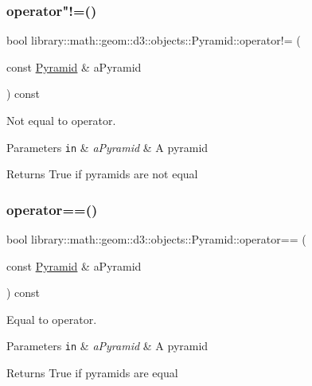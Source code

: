 \subsubsection{\texorpdfstring{operator"!=()}{operator!=()}}
{\footnotesize\ttfamily bool library\+::math\+::geom\+::d3\+::objects\+::\+Pyramid\+::operator!= (\begin{DoxyParamCaption}\item[{const \hyperlink{classlibrary_1_1math_1_1geom_1_1d3_1_1objects_1_1_pyramid}{Pyramid} \&}]{a\+Pyramid }\end{DoxyParamCaption}) const}



Not equal to operator. 


\begin{DoxyParams}[1]{Parameters}
\mbox{\tt in}  & {\em a\+Pyramid} & A pyramid \\
\hline
\end{DoxyParams}
\begin{DoxyReturn}{Returns}
True if pyramids are not equal 
\end{DoxyReturn}
\mbox{\label{classlibrary_1_1math_1_1geom_1_1d3_1_1objects_1_1_pyramid_adfb99bef5bd74a3b0fe75dcf0c61bd61}} 
\subsubsection{\texorpdfstring{operator==()}{operator==()}}
{\footnotesize\ttfamily bool library\+::math\+::geom\+::d3\+::objects\+::\+Pyramid\+::operator== (\begin{DoxyParamCaption}\item[{const \hyperlink{classlibrary_1_1math_1_1geom_1_1d3_1_1objects_1_1_pyramid}{Pyramid} \&}]{a\+Pyramid }\end{DoxyParamCaption}) const}



Equal to operator. 


\begin{DoxyParams}[1]{Parameters}
\mbox{\tt in}  & {\em a\+Pyramid} & A pyramid \\
\hline
\end{DoxyParams}
\begin{DoxyReturn}{Returns}
True if pyramids are equal 
\end{DoxyReturn}
\mbox{\label{classlibrary_1_1math_1_1geom_1_1d3_1_1objects_1_1_pyramid_a150cd331b3dc6e36c74b37bc6988f019}} 
